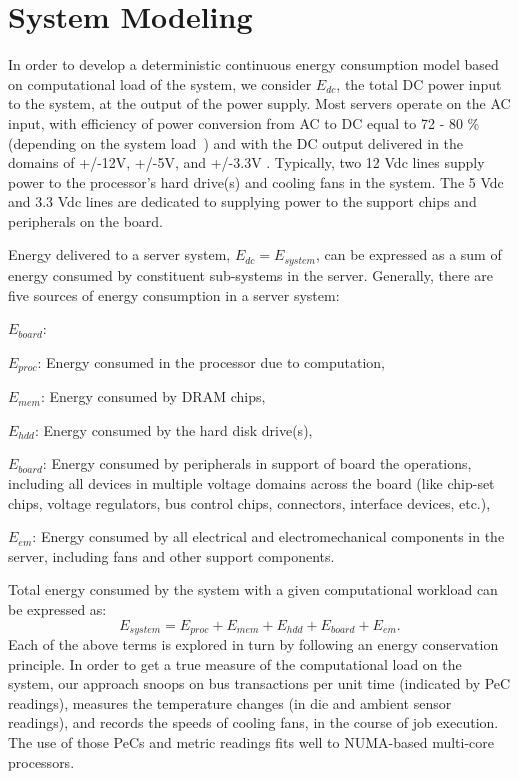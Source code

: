 \documentclass[acmtaco]{acmtrans2m}
\begin{document}
\section{System Modeling}
\label{sec:modelstruct}
In order to develop a deterministic continuous energy consumption model
based on computational load of the system, we consider $E_{dc}$, the
total DC power input to the system, at the output of the power supply.
Most servers operate on the AC input, with efficiency of power
conversion from AC to DC equal to 72 - 80 \% (depending on the system
load~\cite{ton2008}) and with the DC output delivered in the domains of
+/-12V, +/-5V, and +/-3.3V \cite{SSI2004}.  Typically, two 12 Vdc lines
supply power to the processor's hard drive(s) and cooling fans in the
system.  The 5 Vdc and 3.3 Vdc lines are dedicated to supplying power to
the support chips and peripherals on the board.

Energy delivered to a server system, $E_{dc} = E_{system}$, can be
expressed as a sum of energy consumed by constituent sub-systems in the
server.  Generally, there are five sources of energy consumption in a
server system:
\begin{describe}{{\em $E_{board}$\/}:}
\item{$E_{proc}$:} Energy consumed in the processor due to computation,
\item{$E_{mem}$:} Energy consumed by DRAM chips,
\item{$E_{hdd}$:} Energy consumed by the hard disk drive(s),
\item{$E_{board}$:} Energy consumed by peripherals in support of board the
  operations, including all devices in multiple voltage domains across the board
  (like chip-set chips, voltage regulators, bus control chips, connectors, interface devices, etc.),
\item{$E_{em}$:} Energy consumed by all electrical and electromechanical
  components in the server, including fans and other support components.
\end{describe}

Total energy consumed by the system with a given computational workload
can be expressed as:
\begin{equation}
\label{eq:linmodel}
E_{system}= E_{proc} + E_{mem} + E_{hdd}+ E_{board} +  E_{em}.
\end{equation}
Each of the above terms is explored in turn by following an energy
conservation principle.  In order to get a true measure of the
computational load on the system, our approach snoops on bus
transactions per unit time (indicated by PeC readings), measures the
temperature changes (in die and ambient sensor readings), and records
the speeds of cooling fans, in the course of job execution.  The use of
those PeCs and metric readings fits well to NUMA-based multi-core
processors. 
\end{document}
